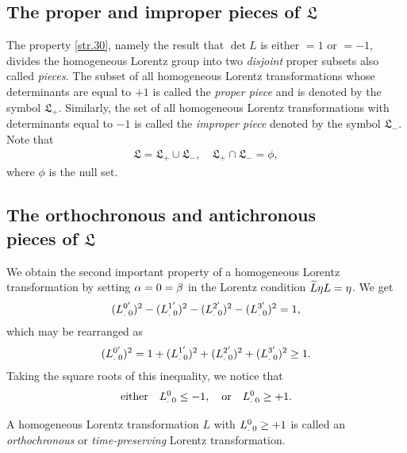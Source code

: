 \begin{small}
\subsection{The proper and improper pieces of 
{$\mathfrak{L}$}{}} The property 
\eqref{str.30}, namely the result  that $\det L$ is either 
$=1$ {or}  $= -1$, divides the homogeneous Lorentz group 
into two \textsl{disjoint} proper subsets also called 
\textsl{pieces}. The subset of all homogeneous  Lorentz 
transformations whose determinants are equal to $+1$ is 
called the \textsl{proper piece} and is denoted by the 
symbol $\mathfrak{L}_+$. Similarly, the set of all 
homogeneous Lorentz transformations with determinants equal 
to $-1$ is called the \textsl{improper piece} denoted by 
the symbol $\mathfrak{L}_-$. Note that
\begin{align*}
\mathfrak{L}=\mathfrak{L}_+ \cup \mathfrak{L}_-,\quad
\mathfrak{L}_+ \cap \mathfrak{L}_- =\phi,
\end{align*}
where $\phi$ is the null set.

\subsection{The orthochronous and antichronous\\ pieces of 
{$\mathfrak{L}$}{}} 
We obtain the {second important property of a homogeneous 
Lorentz transformation} by setting ${\alpha}=0={\beta}$ in the 
Lorentz condition $\widetilde{L}{\eta} L={\eta}$. We get
\begin{align*}
({{L}^{0'}_{.\;0}})^2
-({{L}^{1'}_{.\;0}})^2-({{L}^{2'}_{.\;0}})^2-({{L}^{3'}_{.\;0}})^2=1,
\end{align*}
which may be rearranged as
\begin{align}\label{str.54}
({{L}^{0'}_{.\;0}})^2=1 + ({{L}^{1'}_{.\;0}})^2 +
({{L}^{2'}_{.\;0}})^2+({{L}^{3'}_{.\; 0}})^2 \geq 1.
\end{align}
Taking the square roots of this inequality, we notice that
\begin{align}\label{str.55}
\text{{either}}\quad {\ensuremath{{L}^{0}_{.\;0}}} \leq
-1, \quad
\text{{or}} \quad {\ensuremath{{L}^{0}_{.\;0}}} \geq +1.
\end{align}

\dfn A homogeneous Lorentz transformation $L$ with 
${{L}^{0}_{.\;0}}\geq +1 $ is called an 
\textsl{orthochronous} 
or \textsl{time-preserving} Lorentz transformation. 


\end{small}
